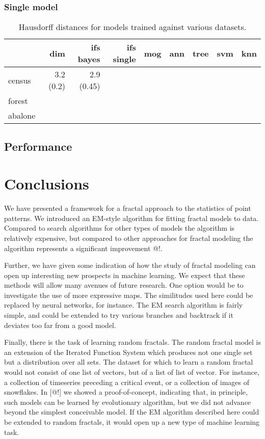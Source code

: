 \documentclass[11pt]{article}
\theoremstyle{definition}
\begin{document}
\subsubsection{Single model}

\begin{table}
\begin{tabular}{l r | r r | r r r r r |}
\hline
  & dim & ifs bayes & ifs single & mog & ann & tree & svm & knn \\
\hline
census & 3.2 (0.2) & 2.9 (0.45) & & & & \\
forest & & & & & & \\
abalone & & & & & & \\
\hline

\end{tabular}
\caption{Hausdorff distances for models trained against various datasets.}
\label{tablelabel}
\end{table}
\subsection{Performance}

\section{Conclusions}

We have presented a framework for a fractal approach to the statistics of point patterns. We introduced an EM-style algorithm for fitting fractal models to data. Compared to search algorithms for other types of models the algorithm is relatively expensive, but compared to other approaches for fractal modeling the algorithm represents a significant improvement @!. 

Further, we have given some indication of how the study of fractal modeling can open up interesting new prospects in machine learning. We expect that these methods will allow many avenues of future research. One option would be to investigate the use of more expressive maps. The similitudes used here could be replaced by neural networks, for instance. The EM search algorithm is fairly simple, and could be extended to try various branches and backtrack if it deviates too far from a good model.

Finally, there is the task of learning random fractals. The random fractal model is an extension of the Iterated Function System which produces not one single set but a distribution over all sets. The dataset for which to learn a random fractal would not consist of one list of vectors, but of a list of list of vector. For instance, a collection of timeseries preceding a critical event, or a collection of images of snowflakes. In [@!] we showed a proof-of-concept, indicating that, in principle, such models can be learned by evolutionary algorithm, but we did not advance beyond the simplest conceivable model. If the EM algorithm described here could be extended to random fractals, it would open up a new type of machine learning task.



\end{document}
